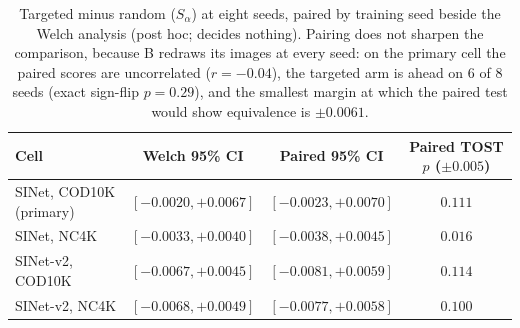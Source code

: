\begin{table}[h]
\caption{Targeted minus random ($S_\alpha$) at eight seeds, paired by training seed beside the Welch analysis (post hoc;
decides nothing). Pairing does not sharpen the comparison, because B redraws its images at every seed: on the primary
cell the paired scores are uncorrelated ($r = -0.04$), the targeted arm is ahead on $6$ of $8$ seeds (exact sign-flip
$p = 0.29$), and the smallest margin at which the paired test would show equivalence is $\pm 0.0061$.}
\label{tab:paired}
\begin{center}
\scriptsize
\setlength{\tabcolsep}{4pt}
\begin{tabular}{@{}lccc@{}}
\toprule
Cell & Welch 95\% CI & Paired 95\% CI & Paired TOST $p$ ($\pm0.005$) \\
\midrule
SINet, COD10K (primary) & $[-0.0020, +0.0067]$ & $[-0.0023, +0.0070]$ & $0.111$ \\
SINet, NC4K & $[-0.0033, +0.0040]$ & $[-0.0038, +0.0045]$ & $\mathbf{0.016}$ \\
SINet-v2, COD10K & $[-0.0067, +0.0045]$ & $[-0.0081, +0.0059]$ & $0.114$ \\
SINet-v2, NC4K & $[-0.0068, +0.0049]$ & $[-0.0077, +0.0058]$ & $0.100$ \\
\bottomrule
\end{tabular}
\end{center}
\end{table}

